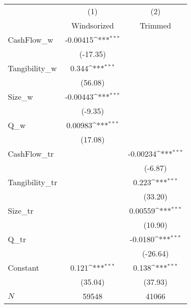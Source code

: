 {
\def\sym#1{\ifmmode^{#1}\else\(^{#1}\)\fi}
\begin{tabular}{l*{2}{c}}
\hline\hline
            &\multicolumn{1}{c}{(1)}         &\multicolumn{1}{c}{(2)}         \\
            & Windsorized         &     Trimmed         \\
\hline
CashFlow\_w  &    -0.00415\sym{***}&                     \\
            &    (-17.35)         &                     \\
Tangibility\_w&       0.344\sym{***}&                     \\
            &     (56.08)         &                     \\
Size\_w      &    -0.00443\sym{***}&                     \\
            &     (-9.35)         &                     \\
Q\_w         &     0.00983\sym{***}&                     \\
            &     (17.08)         &                     \\
CashFlow\_tr &                     &    -0.00234\sym{***}\\
            &                     &     (-6.87)         \\
Tangibility\_tr&                     &       0.223\sym{***}\\
            &                     &     (33.20)         \\
Size\_tr     &                     &     0.00559\sym{***}\\
            &                     &     (10.90)         \\
Q\_tr        &                     &     -0.0180\sym{***}\\
            &                     &    (-26.64)         \\
Constant    &       0.121\sym{***}&       0.138\sym{***}\\
            &     (35.04)         &     (37.93)         \\
\hline
\(N\)       &       59548         &       41066         \\
\hline\hline
\end{tabular}
}
